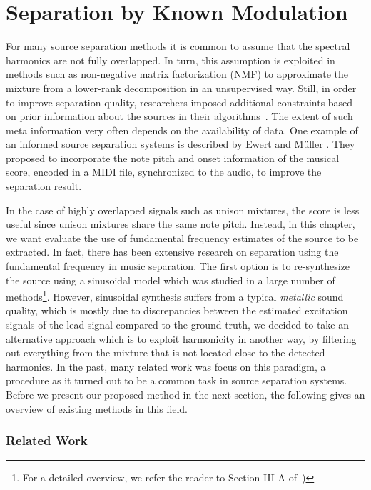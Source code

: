 \chapter{Separation by Known Modulation}
\label{cha:known}


For many source separation methods it is common to assume that the spectral harmonics are not fully overlapped.
In turn, this assumption is exploited in methods such as non-negative matrix factorization (NMF) to approximate the mixture from a lower-rank decomposition in an unsupervised way.
Still, in order to improve separation quality, researchers imposed additional constraints based on  prior information about the sources in their algorithms~\cite{ozerov12}.
The extent of such meta information very often depends on 
the availability of data.
One example of an informed source separation systems is described by Ewert and M\"uller \cite{ewert12}.
They proposed to incorporate the note pitch and onset information of the musical score, encoded in a MIDI file, synchronized to the audio, to improve the separation result.
\par
In the case of highly overlapped signals such as unison mixtures, the score is less useful since unison mixtures share the same note pitch.
Instead, in this chapter, we want evaluate the use of fundamental frequency estimates of the source to be extracted.
In fact, there has been extensive research on separation using the fundamental frequency in music separation.
The first option is to re-synthesize the source using a sinusoidal model which was studied in a large number of methods\footnote{For a detailed overview, we refer the reader to Section III A of~\cite{rafii})}.
However, sinusoidal synthesis suffers from a typical \textit{metallic} sound quality, which is mostly due to discrepancies between the estimated excitation signals of the lead signal compared to the ground truth, we decided to take an alternative approach which is to exploit harmonicity in another way, by filtering out everything from the mixture that is not located close to the detected harmonics.
In the past, many related work was focus on this paradigm, a procedure as it turned out to be a common task in source separation systems. 
Before we present our proposed method in the next section, the following gives an overview of existing methods in this field.

\subsection*{Related Work}

